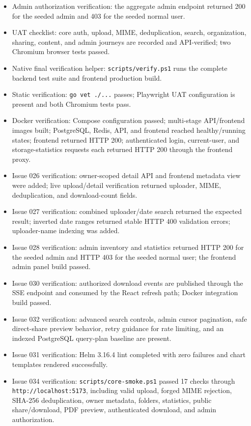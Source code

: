 \documentclass[11pt,a4paper]{article}
\begin{document}
\begin{itemize}[leftmargin=*]
  \item Admin authorization verification: the aggregate admin endpoint returned 200 for the seeded admin and 403 for the seeded normal user.
  \item UAT checklist: core auth, upload, MIME, deduplication, search, organization, sharing, content, and admin journeys are recorded and API-verified; two Chromium browser tests passed.
  \item Native final verification helper: \texttt{scripts/verify.ps1} runs the complete backend test suite and frontend production build.
  \item Static verification: \texttt{go vet ./...} passes; Playwright UAT configuration is present and both Chromium tests pass.
  \item Docker verification: Compose configuration passed; multi-stage API/frontend images built; PostgreSQL, Redis, API, and frontend reached healthy/running states; frontend returned HTTP 200; authenticated login, current-user, and storage-statistics requests each returned HTTP 200 through the frontend proxy.
  \item Issue 026 verification: owner-scoped detail API and frontend metadata view were added; live upload/detail verification returned uploader, MIME, deduplication, and download-count fields.
  \item Issue 027 verification: combined uploader/date search returned the expected result; inverted date ranges returned stable HTTP 400 validation errors; uploader-name indexing was added.
  \item Issue 028 verification: admin inventory and statistics returned HTTP 200 for the seeded admin and HTTP 403 for the seeded normal user; the frontend admin panel build passed.
  \item Issue 030 verification: authorized download events are published through the SSE endpoint and consumed by the React refresh path; Docker integration build passed.
  \item Issue 032 verification: advanced search controls, admin cursor pagination, safe direct-share preview behavior, retry guidance for rate limiting, and an indexed PostgreSQL query-plan baseline are present.
  \item Issue 031 verification: Helm 3.16.4 lint completed with zero failures and chart templates rendered successfully.
  \item Issue 034 verification: \texttt{scripts/core-smoke.ps1} passed 17 checks through \texttt{http://localhost:5173}, including valid upload, forged MIME rejection, SHA-256 deduplication, owner metadata, folders, statistics, public share/download, PDF preview, authenticated download, and admin authorization.

\end{itemize}
\end{document}
